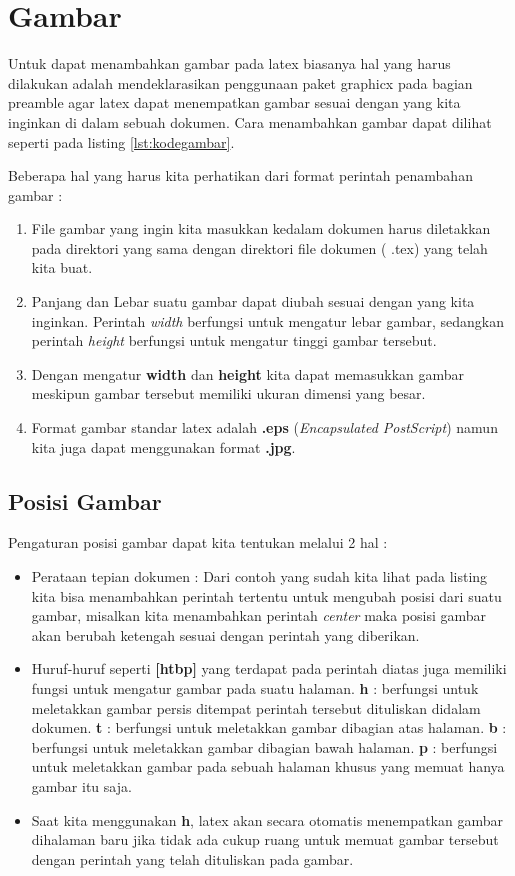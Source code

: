 \section{Gambar}
Untuk dapat menambahkan gambar pada latex biasanya hal yang harus dilakukan adalah mendeklarasikan penggunaan paket graphicx pada bagian preamble agar latex dapat menempatkan gambar sesuai dengan yang kita inginkan di dalam sebuah dokumen. Cara menambahkan gambar dapat dilihat seperti pada listing \ref{lst:kodegambar}.

Beberapa hal yang harus kita perhatikan dari format perintah penambahan gambar :
\begin{enumerate}
\item File gambar yang ingin kita masukkan kedalam dokumen harus diletakkan pada direktori yang sama dengan direktori file dokumen ( .tex) yang telah kita buat.
\item Panjang dan Lebar suatu gambar dapat diubah sesuai dengan yang kita inginkan. Perintah \textit{width} berfungsi untuk mengatur lebar gambar, sedangkan perintah \textit{height} berfungsi untuk mengatur tinggi gambar tersebut.
\item Dengan mengatur \textbf{width} dan \textbf{height} kita dapat memasukkan gambar meskipun gambar tersebut memiliki ukuran dimensi yang besar.
\item Format gambar standar latex adalah \textbf{ .eps} (\textit{Encapsulated PostScript}) namun kita juga dapat menggunakan format \textbf{ .jpg}.
\end{enumerate}
\subsection{Posisi Gambar}
Pengaturan posisi gambar dapat kita tentukan melalui 2 hal : 
\begin{itemize}
\item Perataan tepian dokumen : Dari contoh yang sudah kita lihat pada listing kita bisa menambahkan perintah tertentu untuk mengubah posisi dari suatu gambar, misalkan kita menambahkan perintah \textit{center} maka posisi gambar akan berubah ketengah sesuai dengan perintah yang diberikan.
\item Huruf-huruf seperti \textbf{[htbp]} yang terdapat pada perintah diatas juga memiliki fungsi untuk mengatur gambar pada suatu halaman.
\subitem \textbf{h} : berfungsi untuk meletakkan gambar persis ditempat perintah tersebut dituliskan didalam dokumen.
\subitem \textbf{t} : berfungsi untuk meletakkan gambar dibagian atas halaman.
\subitem \textbf{b} : berfungsi untuk meletakkan gambar dibagian bawah halaman.
\subitem \textbf{p} : berfungsi untuk meletakkan gambar pada sebuah halaman khusus yang memuat hanya gambar itu saja.
\item Saat kita menggunakan \textbf{h}, latex akan secara otomatis menempatkan gambar dihalaman baru jika tidak ada cukup ruang untuk memuat gambar tersebut dengan perintah yang telah dituliskan pada gambar.
\end{itemize}

